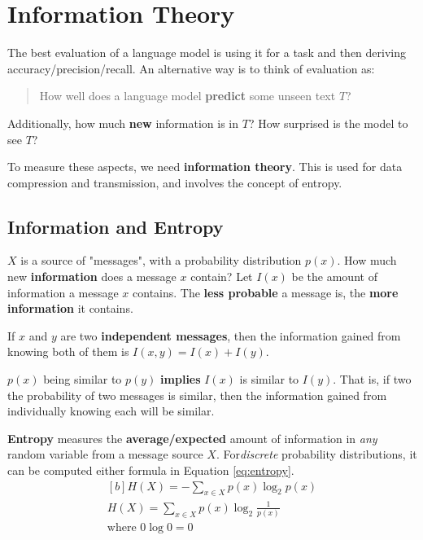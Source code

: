 \documentclass{article}
\begin{document}
\section{Information Theory}

The best evaluation of a language model is using it for a task and then deriving accuracy/precision/recall. An alternative way is to think of evaluation as:
\begin{quote}
	How well does a language model \textbf{predict} some unseen text $T$?
\end{quote}
Additionally, how much \textbf{new} information is in $T$? How surprised is the model to see $T$?

To measure these aspects, we need \textbf{information theory}. This is used for data compression and transmission, and involves the concept of entropy.

\subsection{Information and Entropy}

$X$ is a source of "messages", with a probability distribution $p(x)$. How much new \textbf{information} does a message $x$ contain? Let $I(x)$ be the amount of information a message $x$ contains. The \textbf{less probable} a message is, the \textbf{more information} it contains.

If $x$ and $y$ are two \textbf{independent messages}, then the information gained from knowing both of them is $I(x, y) = I(x) + I(y)$.

$p(x)$  being similar to $p(y)$ \textbf{implies} $I(x)$ is similar to $I(y)$. That is, if two the probability of two messages is similar, then the information gained from individually knowing each will be similar.

\textbf{Entropy} measures the \textbf{average/expected} amount of information in \textit{any} random variable from a message source $X$. For\textit{discrete} probability distributions, it can be computed either formula in Equation \ref{eq:entropy}.
\begin{equation}
	\begin{aligned}[b]
		H(X) = -\sum_{x \in X} { p(x) \log_2 p(x) } \\
		H(X) = \sum_{x \in X} { p(x) \log_2 {\frac{1}{p(x)}} } \\
		\text{where }0\log0 = 0
	\end{aligned}
	\label{eq:entropy}
\end{equation}
\end{document}
